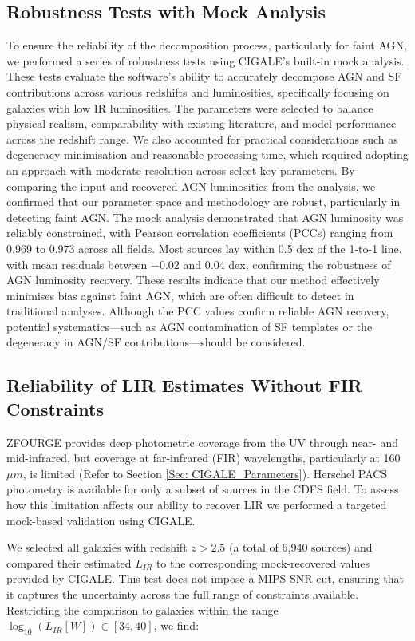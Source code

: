 \subsection{Robustness Tests with Mock Analysis} \label{Sec: Mock_Analysis}
To ensure the reliability of the decomposition process, particularly for faint AGN, we performed a series of robustness tests using CIGALE's built-in mock analysis. These tests evaluate the software's ability to accurately decompose AGN and SF contributions across various redshifts and luminosities, specifically focusing on galaxies with low IR luminosities.  The parameters were selected to balance physical realism, comparability with existing literature, and model performance across the redshift range. We also accounted for practical considerations such as degeneracy minimisation and reasonable processing time, which required adopting an approach with moderate resolution across select key parameters. By comparing the input and recovered AGN luminosities from the analysis, we confirmed that our parameter space and methodology are robust, particularly in detecting faint AGN. The mock analysis demonstrated that AGN luminosity was reliably constrained, with Pearson correlation coefficients (PCCs) ranging from 0.969 to 0.973 across all fields. Most sources lay within 0.5 dex of the 1-to-1 line, with mean residuals between $-0.02$ and $0.04$ dex, confirming the robustness of AGN luminosity recovery. These results indicate that our method effectively minimises bias against faint AGN, which are often difficult to detect in traditional analyses. Although the PCC values confirm reliable AGN recovery, potential systematics—such as AGN contamination of SF templates or the degeneracy in AGN/SF contributions—should be considered.

\subsection{Reliability of LIR Estimates Without FIR Constraints} \label{Sec: FIR Constraints}
ZFOURGE provides deep photometric coverage from the UV through near- and mid-infrared, but coverage at far-infrared (FIR) wavelengths, particularly at 160$\mu m$, is limited (Refer to Section \ref{Sec: CIGALE_Parameters}). Herschel PACS photometry is available for only a subset of sources in the CDFS field. To assess how this limitation affects our ability to recover LIR we performed a targeted mock-based validation using CIGALE.

We selected all galaxies with redshift $z > 2.5$ (a total of 6,940 sources) and compared their estimated $L_{IR}$ to the corresponding mock-recovered values provided by CIGALE. This test does not impose a MIPS SNR cut, ensuring that it captures the uncertainty across the full range of constraints available. Restricting the comparison to galaxies within the range $\log_{10}(L_{IR} [W]) \in [34, 40]$, we find:

